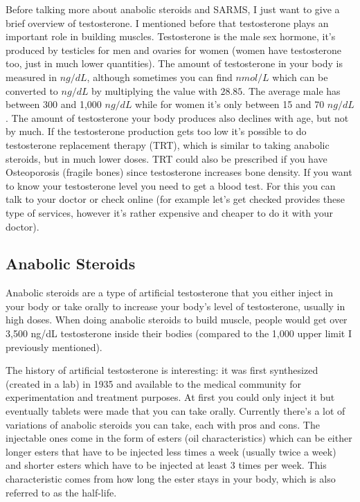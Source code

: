 \documentclass[openany, 12pt]{book}
\begin{document}
        Before talking more about anabolic steroids and SARMS, I just want to give a brief overview of testosterone. I mentioned before that testosterone plays an important role in building muscles.
        Testosterone is the male sex hormone, it's produced by testicles for men and ovaries for women (women have testosterone too, just in much lower quantities).
        The amount of testosterone in your body is measured in $ng/dL$, although sometimes you can find $nmol/L$ which can be converted to $ng/dL$ by multiplying the value with $28.85$.
        The average male has between 300 and 1,000 $ng/dL$ while for women it's only between 15 and 70 $ng/dL$. The amount of testosterone your body produces also declines with age, but not by much.
        If the testosterone production gets too low it's possible to do testosterone replacement therapy (TRT), which is similar to taking anabolic steroids, but in much lower doses.
        TRT could also be prescribed if you have Osteoporosis (fragile bones) since testosterone increases bone density.
        If you want to know your testosterone level you need to get a blood test. For this you can talk to your doctor or check online (for example let's get checked
        provides these type of services, however it's rather expensive and cheaper to do it with your doctor).

        \subsection{Anabolic Steroids}

        Anabolic steroids are a type of artificial testosterone that you either inject in your body or take orally to increase your body's level of testosterone, usually in high doses.
        When doing anabolic steroids to build muscle, people would get over 3,500 ng/dL testosterone inside their bodies
        (compared to the 1,000 upper limit I previously mentioned).

        The history of artificial testosterone is interesting: it was first synthesized (created in a lab) in 1935 and available to the medical community for experimentation and
        treatment purposes.
        At first you could only inject it but eventually tablets were made that you can take orally. Currently there's a lot of variations of anabolic steroids you can take, each with pros and cons.
        The injectable ones come in the form of esters (oil characteristics) which can be either longer esters that have to be injected less times a week (usually twice a week) and shorter esters which have
        to be injected at least 3 times per week. This characteristic comes from how long the ester stays in your body, which is also referred to as the half-life.
        
\end{document}
